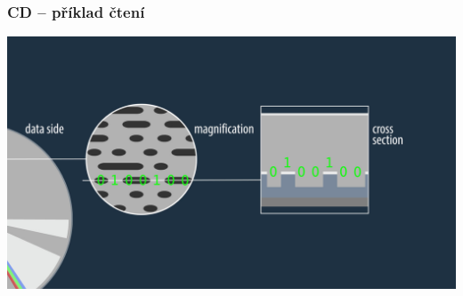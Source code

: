\documentclass[aspectratio=169,11pt,svgnames,handout]{beamer}
\begin{document}
\begin{frame}
 \frametitle{CD -- příklad čtení}
 \begin{center}
  \includegraphics[width=.8\textwidth]{cd_reading}
 \end{center}
\end{frame}
\end{document}
